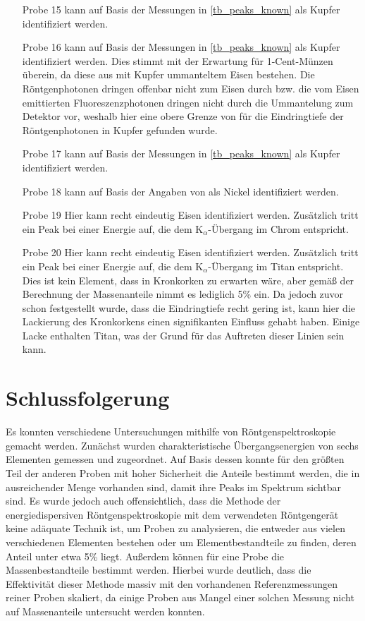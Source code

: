 \documentclass[
	a4paper,
	12pt,
	pagesize,
	ngerman
]{scrartcl}
\begin{document}
\begin{enumerate}
		\item[Probe 15] kann auf Basis der Messungen in \cref{tb_peaks_known} als Kupfer identifiziert werden.
		\item[Probe 16] kann auf Basis der Messungen in \cref{tb_peaks_known} als Kupfer identifiziert werden. Dies stimmt mit der Erwartung für 1-Cent-Münzen überein, da diese aus mit Kupfer ummanteltem Eisen bestehen. Die Röntgenphotonen dringen offenbar nicht zum Eisen durch bzw. die vom Eisen emittierten Fluoreszenzphotonen dringen nicht durch die Ummantelung zum Detektor vor, weshalb hier eine obere Grenze von  für die Eindringtiefe der Röntgenphotonen in Kupfer gefunden wurde. %
		\item[Probe 17] kann auf Basis der Messungen in \cref{tb_peaks_known} als Kupfer identifiziert werden.
		\item[Probe 18] kann auf Basis der Angaben von \cite{XRAYDB} als Nickel identifiziert werden.
		\item[Probe 19] Hier kann recht eindeutig Eisen identifiziert werden. Zusätzlich tritt ein Peak bei einer Energie auf, die dem $\text{K}_\alpha$-Übergang im Chrom entspricht.
		\item[Probe 20] Hier kann recht eindeutig Eisen identifiziert werden. Zusätzlich tritt ein Peak bei einer Energie auf, die dem $\text{K}_\alpha$-Übergang im Titan entspricht. Dies ist kein Element, dass in Kronkorken zu erwarten wäre, aber gemäß der Berechnung der Massenanteile nimmt es lediglich 5\% ein. Da jedoch zuvor schon festgestellt wurde, dass die Eindringtiefe recht gering ist, kann hier die Lackierung des Kronkorkens einen signifikanten Einfluss gehabt haben. Einige Lacke enthalten Titan, was der Grund für das Auftreten dieser Linien sein kann.
	\end{enumerate}

	\section{Schlussfolgerung}
	Es konnten verschiedene Untersuchungen mithilfe von Röntgenspektroskopie gemacht werden.
	Zunächst wurden charakteristische Übergangsenergien von sechs Elementen gemessen und zugeordnet.
	Auf Basis dessen konnte für den größten Teil der anderen Proben mit hoher Sicherheit die Anteile bestimmt werden, die in ausreichender Menge vorhanden sind, damit ihre Peaks im Spektrum sichtbar sind.
	Es wurde jedoch auch offensichtlich, dass die Methode der energiedispersiven Röntgenspektroskopie mit dem verwendeten Röntgengerät keine adäquate Technik ist, um Proben zu analysieren, die entweder aus vielen verschiedenen Elementen bestehen oder um Elementbestandteile zu finden, deren Anteil unter etwa 5\% liegt. %
	Außerdem können für eine Probe die Massenbestandteile bestimmt werden.
	Hierbei wurde deutlich, dass die Effektivität dieser Methode massiv mit den vorhandenen Referenzmessungen reiner Proben skaliert, da einige Proben aus Mangel einer solchen Messung nicht auf Massenanteile untersucht werden konnten.
\end{document}
